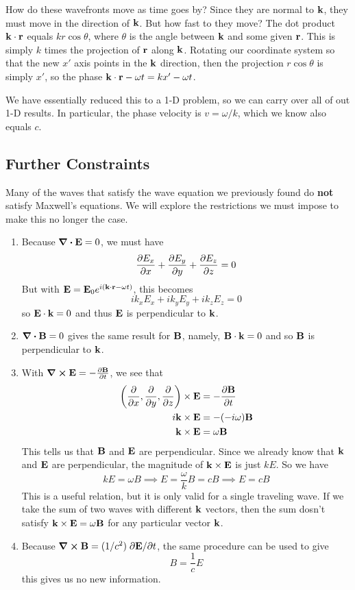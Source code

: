 How do these wavefronts move as time goes by? Since they are normal to $\mathbf{k}$, they must move in the direction of $\mathbf{k}$. But how fast to they move? The dot product $\mathbf{k} \cdot \mathbf{r}$ equals $kr\cos\theta$, where $\theta$ is the angle between $\mathbf{k}$ and some given $\mathbf{r}$. This is simply $k$ times the projection of $\mathbf{r}$ along $\mathbf{k}$. Rotating our coordinate system so that the new $x'$ axis points in the $\mathbf{k}$ direction, then the projection $r\cos\theta$ is simply $x'$, so the phase $\mathbf{k}\cdot \mathbf{r} - \omega t = kx' - \omega t$.

We have essentially reduced this to a 1-D problem, so we can carry over all of out 1-D results. In particular, the phase velocity is $v= \omega/k$, which we know also equals $c$.
\subsection*{Further Constraints}
Many of the waves that satisfy the wave equation we previously found do \textbf{not} satisfy Maxwell's equations. We will explore the restrictions we must impose to make this no longer the case.
\begin{enumerate}
    \item Because $\div \mathbf{E} = 0$, we must have 
    \[ \pdv{E_x}{x} + \pdv{E_y}{y} + \pdv{E_z}{z} = 0\]
    But with $\mathbf{E} = \mathbf{E}_0 e^{i(\mathbf{k} \cdot \mathbf{r} - \omega t)}$, this becomes
    \[ ik_xE_x + ik_y E_y + ik_z E_z = 0\]
    so $\mathbf{E} \cdot \mathbf{k} = 0$ and thus $\mathbf{E}$ is perpendicular to $\mathbf{k}$.
    \item $\div \mathbf{B} = 0$ gives the same result for $\mathbf{B}$, namely, $\mathbf{B} \cdot \mathbf{k} = 0$ and so $\mathbf{B}$ is perpendicular to $\mathbf{k}$.
    \item With $\curl\mathbf{E} = -\pdv{\mathbf{B}}{t}$, we see that 
    \begin{align*}
        \pqty{\pdv{x}, \pdv{y}, \pdv{z} }\times \mbf E &= - \pdv{\mbf B}{t} \\
        i\mbf k \times \mbf E &= -(-i\omega )\mbf B \\
        \mbf k \times \mbf E &= \omega \mbf B
    \end{align*}
    This tells us that $\mathbf{B}$ and $\mathbf{E}$ are perpendicular. Since we already know that $\mathbf{k}$ and $\mathbf{E}$ are perpendicular, the magnitude of $\mathbf{k} \times \mathbf{E}$ is just $kE$. So we have
    \[ kE = \omega B \implies E = \frac{\omega}{k} B = cB \implies \boxed{E = cB} \]
    This is a useful relation, but it is only valid for a single traveling wave. If we take the sum of two waves with different $\mathbf{k}$ vectors, then the sum dosn't satisfy $\mathbf{k} \times \mathbf{E} = \omega \mathbf{B}$ for any particular vector $\mathbf{k}$.
    \item Because $\curl \mathbf{B} = (1/c^2) \; \partial \mathbf{E}/\partial t$, the same procedure can be used to give
    \[ B = \frac{1}{c}E\]
    this gives us no new information.
\end{enumerate}
